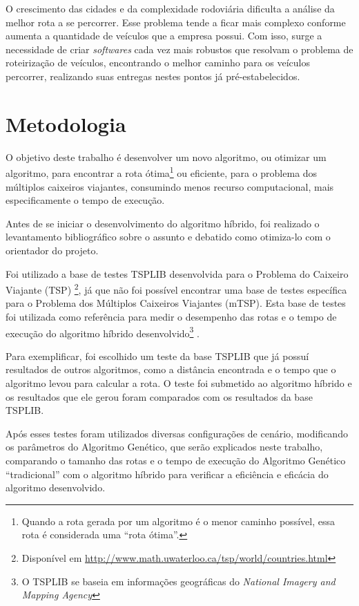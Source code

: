 \documentclass[12pt,openright,a4paper,oneside]{tcc}
\begin{document}
		O crescimento das cidades e da complexidade rodoviária dificulta a análise da melhor rota a se percorrer. Esse problema tende a ficar mais complexo conforme aumenta a quantidade de veículos que a empresa possui. Com isso, surge a necessidade de criar 
		\textit{softwares} cada vez mais robustos que resolvam o problema de roteirização de veículos, encontrando o melhor caminho para os veículos percorrer, realizando suas entregas nestes pontos já pré-estabelecidos.


	\chapter{Metodologia}

		O objetivo deste trabalho é desenvolver um novo algoritmo, ou otimizar um algoritmo, para encontrar a rota ótima\footnote{Quando a rota gerada por um algoritmo é o menor caminho possível, essa rota é considerada uma ``rota ótima''.} ou eficiente, para o problema dos múltiplos caixeiros viajantes, consumindo menos recurso computacional, mais especificamente o tempo de execução. 

		Antes de se iniciar o desenvolvimento do algoritmo híbrido, foi realizado o levantamento bibliográfico sobre o assunto e debatido como otimiza-lo com o orientador do projeto.

		Foi utilizado a base de testes TSPLIB desenvolvida para o Problema do Caixeiro Viajante (TSP) \footnote{Disponível em \url{http://www.math.uwaterloo.ca/tsp/world/countries.html}}, já que não foi possível encontrar uma base de testes específica para o Problema dos Múltiplos Caixeiros Viajantes (mTSP). Esta base de testes foi utilizada como referência para medir o desempenho das rotas e o tempo de execução do algoritmo híbrido desenvolvido\footnote{O TSPLIB se baseia em informações geográficas do \textit{National Imagery and Mapping Agency}} \cite{tsplib}.

		Para exemplificar, foi escolhido um teste da base TSPLIB que já possuí resultados de outros algoritmos, como a distância encontrada e o tempo que o algoritmo levou para calcular a rota. O teste foi submetido ao algoritmo híbrido e os resultados que ele gerou foram comparados com os resultados da base TSPLIB.

		Após esses testes foram utilizados diversas configurações de cenário, modificando os parâmetros do Algoritmo Genético, que serão explicados neste trabalho, comparando o tamanho das rotas e o tempo de execução do Algoritmo Genético ``tradicional'' com o algoritmo híbrido para verificar a eficiência e eficácia do algoritmo desenvolvido. 
\end{document}
